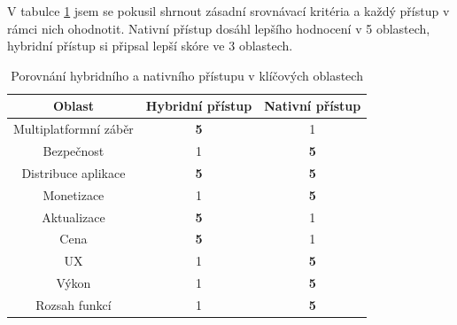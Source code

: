 V tabulce \ref{tab:ComparsionHybridNative} jsem se pokusil shrnout zásadní srovnávací kritéria a každý přístup v rámci nich ohodnotit. Nativní přístup dosáhl lepšího hodnocení v 5 oblastech, hybridní přístup si připsal lepší skóre ve 3 oblastech.
\begin{table}\centering
	\caption[Porovnání hybridního a nativního přístupu v klíčových oblastech]{Porovnání hybridního a nativního přístupu v klíčových oblastech \cite{mobile_dev_nat_hybrid_graph}} 
	\label{tab:ComparsionHybridNative}
		\begin{tabular}{|c|c|c|}\hline
			Oblast	& Hybridní přístup & Nativní přístup
			\tabularnewline \hline \hline
					Multiplatformní záběr	& \textbf{5} & 1
			\tabularnewline \hline
					Bezpečnost	& 1 & \textbf{5}
			\tabularnewline \hline
				Distribuce aplikace & \textbf{5} & \textbf{5}
			\tabularnewline \hline
				Monetizace	& 1 & \textbf{5}
			\tabularnewline \hline
				Aktualizace & \textbf{5} & 1
			\tabularnewline \hline
				Cena & \textbf{5} & 1
			\tabularnewline \hline
				UX & 1 & \textbf{5}
			\tabularnewline \hline
				Výkon & 1 & \textbf{5}
			\tabularnewline \hline
				Rozsah funkcí & 1 & \textbf{5}
			\tabularnewline \hline
		\end{tabular}
\end{table}